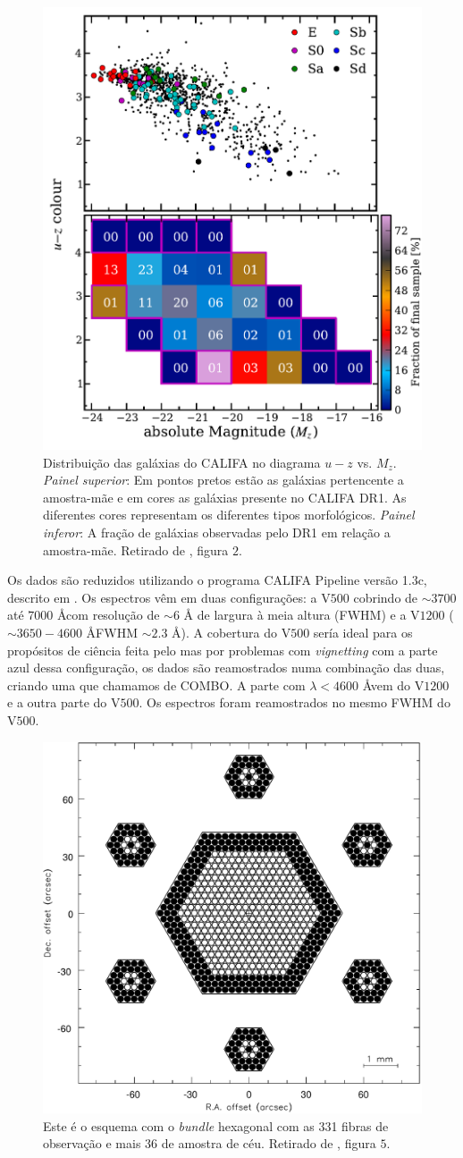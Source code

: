 \begin{figure}
    \includegraphics[height=0.5\textwidth]{figuras/figHusemann2013Fig2.pdf}
    \caption[Diagrama cor-magnitude para as galáxias do CALIFA.]
    {Distribui\c{c}\~ao das galáxias do CALIFA no diagrama $u-z$ vs. $M_z$. 
    {\em Painel superior}: Em pontos pretos est\~ao as galáxias pertencente a
    amostra-m\~ae e em cores as galáxias presente no CALIFA DR1. As diferentes
    cores representam os diferentes tipos morfológicos. {\em Painel inferor}: A
    fra\c{c}\~ao de galáxias observadas pelo DR1 em rela\c{c}\~ao a
    amostra-m\~ae. Retirado de \citet{Husemann2013}, figura $2$.}
    \label{fig:cm-uzMz}
\end{figure}

Os dados são reduzidos utilizando o programa CALIFA Pipeline versão 1.3c,
descrito em \citet{Husemann2013}. Os espectros vêm em duas configurações: a
V$500$ cobrindo de $\sim3700$ até $7000$ \AA com resolução de $\sim6$ \AA
de largura à meia altura (FWHM) e a V$1200$ ($\sim3650-4600$ \AA FWHM $\sim2.3$
\AA). A cobertura do V$500$ sería ideal para os propósitos de ciência feita pelo
\starlight mas por problemas com {\em vignetting} com a parte azul dessa
configuração, os dados são reamostrados numa combinação das duas, criando uma
que chamamos de COMBO. A parte com $\lambda < 4600$ \AA vem do V$1200$ e a outra
parte do V$500$. Os espectros foram reamostrados no mesmo FWHM do V$500$.

\begin{figure}
    \includegraphics[height=0.5\textwidth]{figuras/figVerheijen2004Fig5.pdf}
    \caption[Configura\c{c}\~ao do {\em bundle} de fibras do PPMAS/PPAK.]
    {Este é o esquema com o {\em bundle} hexagonal com as 331 fibras de
    observação e mais 36 de amostra de céu. Retirado de \citet{Verheijen2004},
    figura $5$.}
    \label{fig:BundlePPAK}
\end{figure}

